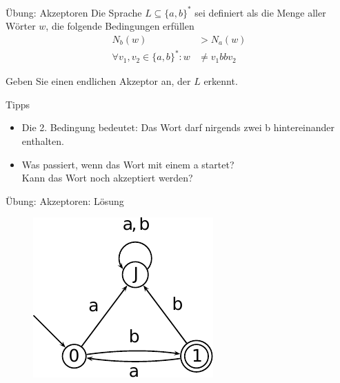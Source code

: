 \begin{frame}{Übung: Akzeptoren}
	Die Sprache $L\subseteq \{a,b\}^\ast $ sei definiert als die Menge aller Wörter $w$, die folgende Bedingungen erfüllen 
	\begin{align*}
		N_b(w) &> N_a(w)\\ 
		\forall v_1,v_2 \in \{a,b\}^\ast : w &\neq v_1 bb v_2 
	\end{align*}
	
	Geben Sie einen endlichen Akzeptor an, der $L$ erkennt. \\
	
	\bigskip
	\pause
	\begin{block}{Tipps}
		\begin{itemize}[<+->]
			\item Die 2. Bedingung bedeutet: Das Wort darf nirgends zwei b hintereinander enthalten.
			\item Was passiert, wenn das Wort mit einem a startet?\\
				  Kann das Wort noch akzeptiert werden?
		\end{itemize}
	\end{block}
\end{frame}

\begin{frame}{Übung: Akzeptoren: Lösung}
	\begin{figure}
		\centering
		\includegraphics[width=0.7\linewidth]{automaten/Loesung2.pdf}
	\end{figure}
\end{frame}




